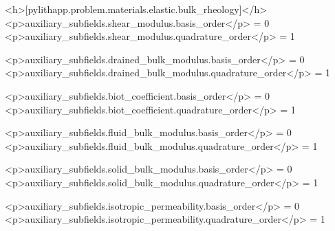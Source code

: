 \begin{cfg}
    <h>[pylithapp.problem.materials.elastic.bulk_rheology]</h>
  <p>auxiliary_subfields.shear_modulus.basis_order</p> = 0
  <p>auxiliary_subfields.shear_modulus.quadrature_order</p> = 1

  <p>auxiliary_subfields.drained_bulk_modulus.basis_order</p> = 0
  <p>auxiliary_subfields.drained_bulk_modulus.quadrature_order</p> = 1

  <p>auxiliary_subfields.biot_coefficient.basis_order</p> = 0
  <p>auxiliary_subfields.biot_coefficient.quadrature_order</p> = 1

  <p>auxiliary_subfields.fluid_bulk_modulus.basis_order</p> = 0
  <p>auxiliary_subfields.fluid_bulk_modulus.quadrature_order</p> = 1

  <p>auxiliary_subfields.solid_bulk_modulus.basis_order</p> = 0
  <p>auxiliary_subfields.solid_bulk_modulus.quadrature_order</p> = 1

  <p>auxiliary_subfields.isotropic_permeability.basis_order</p> = 0
  <p>auxiliary_subfields.isotropic_permeability.quadrature_order</p> = 1
\end{cfg}





